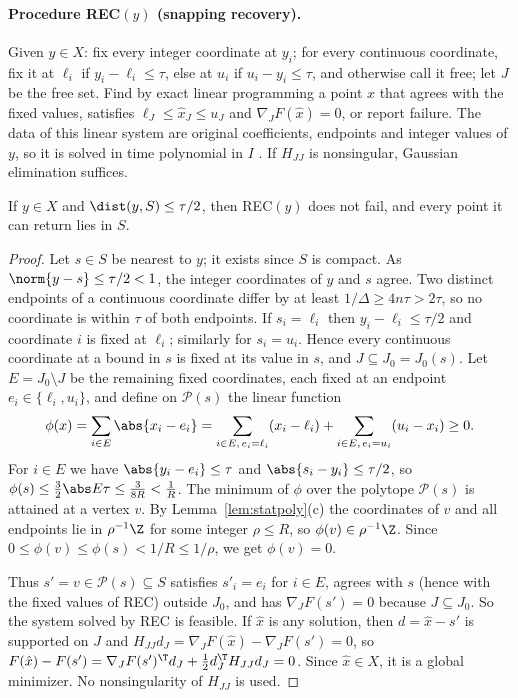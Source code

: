 \paragraph{Procedure REC$(y)$ (snapping recovery).}
Given $y\in X$: fix every integer coordinate at $y_i$; for every continuous
coordinate, fix it at $\ell_i$ if $y_i-\ell_i\le\tau$, else at $u_i$ if
$u_i-y_i\le\tau$, and otherwise call it free; let $J$ be the free set. Find
by exact linear programming a point $\hat x$ that agrees with the fixed
values, satisfies $\ell_J\le\hat x_J\le u_J$ and $\nabla_JF(\hat x)=0$, or
report failure. The data of this linear system are original coefficients,
endpoints and integer values of $y$, so it is solved in time polynomial in
$I$ \cite[Theorem~6.4.12]{GrotschelLovaszSchrijver1988}. If $H_{JJ}$ is
nonsingular, Gaussian elimination suffices.

\begin{lemma}\label{lem:snap}
If $y\in X$ and $\dist(y,S)\le\tau/2$, then REC$(y)$ does not fail, and every
point it can return lies in $S$.
\end{lemma}

\begin{proof}
Let $s\in S$ be nearest to $y$; it exists since $S$ is compact. As
$\norm{y-s}\le\tau/2<1$, the integer coordinates of $y$ and $s$ agree. Two
distinct endpoints of a continuous coordinate differ by at least
$1/\Delta\ge4n\tau>2\tau$, so no coordinate is within $\tau$ of both endpoints. If
$s_i=\ell_i$ then $y_i-\ell_i\le\tau/2$ and coordinate $i$ is fixed at
$\ell_i$; similarly for $s_i=u_i$. Hence every continuous coordinate at a
bound in $s$ is fixed at its value in $s$, and $J\subseteq J_0=J_0(s)$. Let
$E=J_0\setminus J$ be the remaining fixed coordinates, each fixed at an
endpoint $e_i\in\{\ell_i,u_i\}$, and define on $\mathcal P(s)$ the linear
function
\[
\phi(x)=\sum_{i\in E}\abs{x_i-e_i}
=\sum_{i\in E,\,e_i=\ell_i}(x_i-\ell_i)+\sum_{i\in E,\,e_i=u_i}(u_i-x_i)\ge0 .
\]
For $i\in E$ we have $\abs{y_i-e_i}\le\tau$ and $\abs{s_i-y_i}\le\tau/2$, so
$\phi(s)\le\frac32\abs E\tau\le\frac3{8R}<\frac1R$. The minimum of $\phi$
over the polytope $\mathcal P(s)$ is attained at a vertex $v$. By
Lemma~\ref{lem:statpoly}(c) the coordinates of $v$ and all endpoints lie in
$\rho^{-1}\Z$ for some integer $\rho\le R$, so $\phi(v)\in\rho^{-1}\Z$.
Since $0\le\phi(v)\le\phi(s)<1/R\le1/\rho$, we get $\phi(v)=0$.

Thus $s'=v\in\mathcal P(s)\subseteq S$ satisfies $s'_i=e_i$ for $i\in E$,
agrees with $s$ (hence with the fixed values of REC) outside $J_0$, and has
$\nabla_JF(s')=0$ because $J\subseteq J_0$. So the system solved by REC is
feasible. If $\hat x$ is any solution, then $d=\hat x-s'$ is supported on
$J$ and $H_{JJ}d_J=\nabla_JF(\hat x)-\nabla_JF(s')=0$, so
$F(\hat x)-F(s')=\nabla_JF(s')^{\T}d_J+\frac12d_J^{\T}H_{JJ}d_J=0$.
Since $\hat x\in X$, it is a global minimizer. No nonsingularity of $H_{JJ}$
is used.
\end{proof}

